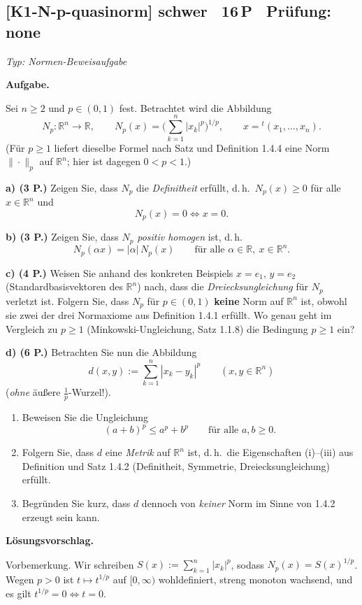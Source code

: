 \documentclass[a4paper,11pt]{article}
\begin{document}
\subsection*{[K1-N-p-quasinorm] \normalfont schwer \textbullet\ 16\,P \textbullet\ Pr\"ufung: none}
\textit{Typ: Normen-Beweisaufgabe}\par\smallskip
\textbf{Aufgabe.}\par
Sei $n\ge 2$ und $p\in(0,1)$ fest. Betrachtet wird die Abbildung
\[
N_p:\mathbb{R}^n\to\mathbb{R},\qquad
N_p(x)=\Big(\sum_{k=1}^n |x_k|^p\Big)^{1/p},\qquad x={}^t(x_1,\dots,x_n).
\]
(Für $p\ge 1$ liefert dieselbe Formel nach Satz und Definition 1.4.4 eine Norm $\|\cdot\|_p$ auf $\mathbb{R}^n$; hier ist dagegen $0<p<1$.)

\textbf{a) (3 P.)} Zeigen Sie, dass $N_p$ die \emph{Definitheit} erfüllt, d.\,h.\ $N_p(x)\ge 0$ für alle $x\in\mathbb{R}^n$ und
\[
N_p(x)=0\iff x=0 .
\]

\textbf{b) (3 P.)} Zeigen Sie, dass $N_p$ \emph{positiv homogen} ist, d.\,h.
\[
N_p(\alpha x)=|\alpha|\,N_p(x)\qquad\text{für alle }\alpha\in\mathbb{R},\ x\in\mathbb{R}^n .
\]

\textbf{c) (4 P.)} Weisen Sie anhand des konkreten Beispiels $x=e_1$, $y=e_2$ (Standardbasisvektoren des $\mathbb{R}^n$) nach, dass die \emph{Dreiecksungleichung} für $N_p$ verletzt ist. Folgern Sie, dass $N_p$ für $p\in(0,1)$ \textbf{keine} Norm auf $\mathbb{R}^n$ ist, obwohl sie zwei der drei Normaxiome aus Definition 1.4.1 erfüllt. Wo genau geht im Vergleich zu $p\ge 1$ (Minkowski-Ungleichung, Satz 1.1.8) die Bedingung $p\ge 1$ ein?

\textbf{d) (6 P.)} Betrachten Sie nun die Abbildung
\[
d(x,y):=\sum_{k=1}^n |x_k-y_k|^p\qquad (x,y\in\mathbb{R}^n)
\]
(\emph{ohne} äußere $\tfrac1p$-Wurzel!).
\begin{enumerate}
\item[(i)] Beweisen Sie die Ungleichung
\[
(a+b)^p\le a^p+b^p\qquad\text{für alle }a,b\ge 0 .
\]
\item[(ii)] Folgern Sie, dass $d$ eine \emph{Metrik} auf $\mathbb{R}^n$ ist, d.\,h.\ die Eigenschaften (i)–(iii) aus Definition und Satz 1.4.2 (Definitheit, Symmetrie, Dreiecksungleichung) erfüllt.
\item[(iii)] Begründen Sie kurz, dass $d$ dennoch von \emph{keiner} Norm im Sinne von 1.4.2 erzeugt sein kann.
\end{enumerate}\par\smallskip
\textbf{L\"osungsvorschlag.}\par
Vorbemerkung. Wir schreiben $S(x):=\sum_{k=1}^n |x_k|^p$, sodass $N_p(x)=S(x)^{1/p}$. Wegen $p>0$ ist $t\mapsto t^{1/p}$ auf $[0,\infty)$ wohldefiniert, streng monoton wachsend, und es gilt $t^{1/p}=0\iff t=0$.
\end{document}
